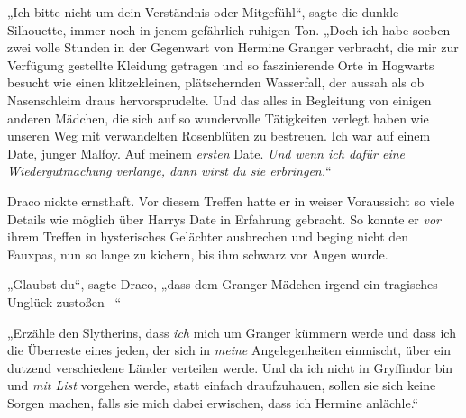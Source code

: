 „Ich bitte nicht um dein Verständnis oder Mitgefühl“, sagte die dunkle Silhouette, immer noch in jenem gefährlich ruhigen Ton. „Doch ich habe soeben zwei volle Stunden in der Gegenwart von Hermine Granger verbracht, die mir zur Verfügung gestellte Kleidung getragen und so faszinierende Orte in Hogwarts besucht wie einen klitzekleinen, plätschernden Wasserfall, der aussah als ob Nasenschleim draus hervorsprudelte. Und das alles in Begleitung von einigen anderen Mädchen, die sich auf so wundervolle Tätigkeiten verlegt haben wie unseren Weg mit verwandelten Rosenblüten zu bestreuen. Ich war auf einem Date, junger Malfoy. Auf meinem \emph{ersten} Date. \emph{Und wenn ich dafür eine Wiedergutmachung verlange, dann wirst du sie erbringen.}“

Draco nickte ernsthaft. Vor diesem Treffen hatte er in weiser Voraussicht so viele Details wie möglich über Harrys Date in Erfahrung gebracht. So konnte er \emph{vor} ihrem Treffen in hysterisches Gelächter ausbrechen und beging nicht den Fauxpas, nun so lange zu kichern, bis ihm schwarz vor Augen wurde.

„Glaubst du“, sagte Draco, „dass dem Granger-Mädchen irgend ein tragisches Unglück zustoßen –“

„Erzähle den Slytherins, dass \emph{ich} mich um Granger kümmern werde und dass ich die Überreste eines jeden, der sich in \emph{meine} Angelegenheiten einmischt, über ein dutzend verschiedene Länder verteilen werde. Und da ich nicht in Gryffindor bin und \emph{mit List} vorgehen werde, statt einfach draufzuhauen, sollen sie sich keine Sorgen machen, falls sie mich dabei erwischen, dass ich Hermine anlächle.“

